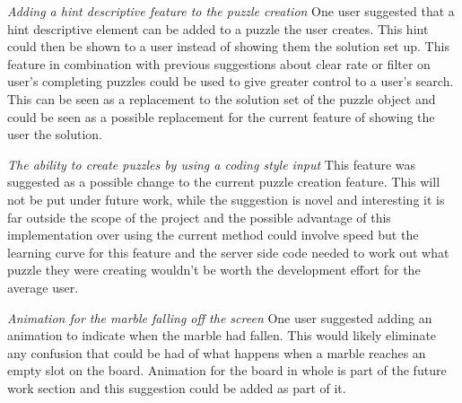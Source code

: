 \documentclass{l4proj}
\begin{document}
\emph{Adding a hint descriptive feature to the puzzle creation}
One user suggested that a hint descriptive element can be added to a puzzle the user creates. This hint could then be shown to a user instead of showing them the solution set up. This feature in combination with previous suggestions about clear rate or filter on user's completing puzzles could be used to give greater control to a user's search. This can be seen as a replacement to the solution set of the puzzle object and could be seen as a possible replacement for the current feature of showing the user the solution.

\emph{The ability to create puzzles by using a coding style input}
This feature was suggested as a possible change to the current puzzle creation feature. This will not be put under future work, while the suggestion is novel and interesting it is far outside the scope of the project and the possible advantage of this implementation over using the current method could involve speed but the learning curve for this feature and the server side code needed to work out what puzzle they were creating wouldn't be worth the development effort for the average user.

\emph{Animation for the marble falling off the screen}
One user suggested adding an animation to indicate when the marble had fallen. This would likely eliminate any confusion that could be had of what happens when a marble reaches an empty slot on the board. Animation for the board in whole is part of the future work section and this suggestion could be added as part of it.
\end{document}
